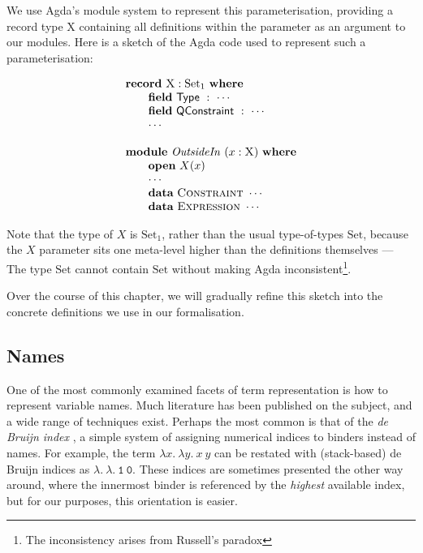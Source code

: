 \documentclass[a4paper]{jfp}
\begin{document}
\noindent We use Agda's module system to represent this parameterisation, providing a record type \textsc{X} containing all definitions within the
parameter as an argument to our modules. Here is a sketch of the Agda code used to represent such a parameterisation:


\begin{displaymath}
   \begin{array}{l}
   \textbf{record}\ \textsc{X} : \text{Set}_1\ \textbf{where} \\ \qquad
   \textbf{field}\ \textsf{Type}\ :\  \cdots \\ \qquad 
   \textbf{field}\ \textsf{QConstraint}\ :\ \cdots \\ \qquad \cdots \\\\
   \textbf{module}\ \mathit{OutsideIn}\ ( x : \textsc{X})\ \textbf{where} \\ \qquad \textbf{open}\ X(x)\\ \qquad \cdots \\
   \qquad \textbf{data}\ \textsc{Constraint}\ \cdots \\ 
   \qquad \textbf{data}\ \textsc{Expression}\ \cdots \\ 
   \end{array}
\end{displaymath}

Note that the type of $X$ is $\text{Set}_1$, rather than the usual type-of-types $\text{Set}$, because the $X$ parameter sits one meta-level higher
than the definitions themselves --- The type $\text{Set}$ cannot contain $\text{Set}$ without making Agda inconsistent\footnote{The inconsistency
   arises from Russell's paradox}.

Over the course of this chapter, we will gradually refine this sketch into the concrete definitions we use in our formalisation. 


\subsection{Names}

One of the most commonly examined facets of term representation is how to represent variable names. Much literature has been published on the subject,
and a wide range of techniques exist. Perhaps the most common is that of the \emph{de Bruijn index} \cite{deBruijn:1972tm}, a simple system of
assigning numerical indices to binders instead of names. For example, the term $\lambda x.\ \lambda y.\ x\ y$ can be restated with (stack-based) de
Bruijn indices as $\lambda.\ \lambda.\ \mathtt{1}\ \mathtt{0}$. These indices are sometimes presented the other way around, where the innermost binder
is referenced by the \emph{highest} available index, but for our purposes, this orientation is easier. 
\end{document}
